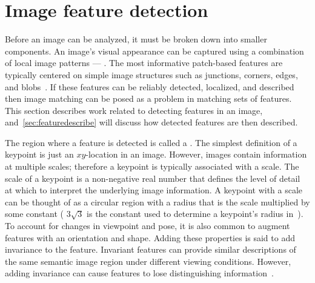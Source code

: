 \section{Image feature detection}\label{sec:featuredetect}

    Before an image can be analyzed, it must be broken down into smaller components. An image's visual appearance
    can be captured using a combination of local image patterns --- . The most
    informative patch-based features are typically centered on simple image structures such as junctions, corners,
    edges, and blobs~\cite{tuytelaars_local_2007}. If these features can be reliably detected, localized, and
    described then image matching can be posed as a problem in matching sets of features. This section describes
    work related to detecting features in an image, and~\cref{sec:featuredescribe} will discuss how detected
    features are then described.

    The region where a feature is detected is called a . The simplest definition of a keypoint
    is just an $xy$-location in an image. However, images contain information at multiple scales; therefore a
    keypoint is typically associated with a scale. The scale of a keypoint is a non-negative real number that
    defines the level of detail at which to interpret the underlying image information. A keypoint with a scale can
    be thought of as a circular region with a radius that is the scale multiplied by some constant %
    (\eg{} $3\sqrt{3}$ is the constant used to determine a keypoint's radius in~\cite{perdoch_efficient_2009}). To
    account for changes in viewpoint and pose, it is also common to augment features with an orientation and shape.
    Adding these properties is said to add invariance to the feature. Invariant features can provide similar
    descriptions of the same semantic image region under different viewing conditions. However, adding invariance
    can cause features to lose distinguishing information~\cite{mikolajczyk_comparison_2005,
    tuytelaars_local_2007, perdoch_efficient_2009, lowe_distinctive_2004}.

